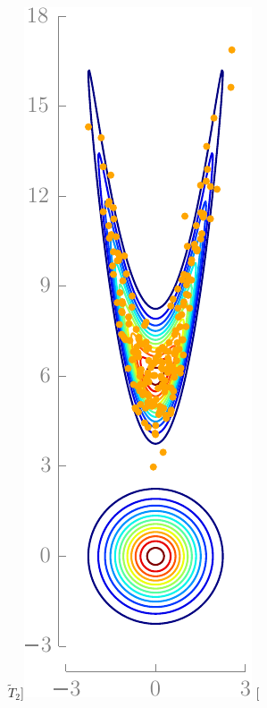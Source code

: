 \documentclass[twoside,11pt]{article}
\begin{document}
\begin{figure}[h]
\begin{center}
$\widetilde{T}_2$]{\includegraphics[scale=\scaleToolMovie]{toolExample_frame4-eps-converted-to.pdf}}
\hspace{\hspaceToolMovie}
\subfloat[\hspace{\hspaceCaptionToolMovie}

\end{center}
\end{figure}
\end{document}

